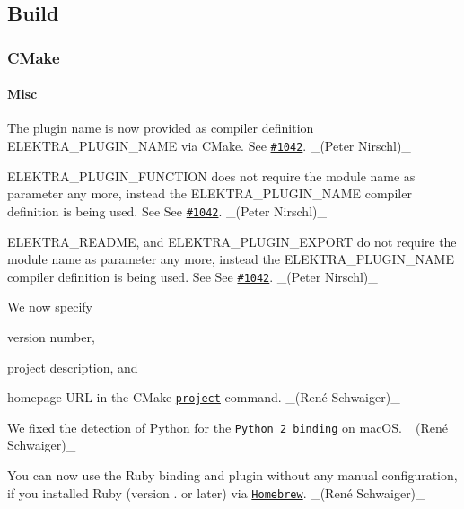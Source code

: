 \subsection*{Build}

\subsubsection*{C\+Make}

\paragraph*{Misc}


\begin{DoxyItemize}
\item The plugin name is now provided as compiler definition {\ttfamily E\+L\+E\+K\+T\+R\+A\+\_\+\+P\+L\+U\+G\+I\+N\+\_\+\+N\+A\+ME} via C\+Make. See \href{https://issues.libelektra.org/1042}{\tt \#1042}. \+\_\+(\+Peter Nirschl)\+\_\+
\item {\ttfamily E\+L\+E\+K\+T\+R\+A\+\_\+\+P\+L\+U\+G\+I\+N\+\_\+\+F\+U\+N\+C\+T\+I\+ON} does not require the module name as parameter any more, instead the {\ttfamily E\+L\+E\+K\+T\+R\+A\+\_\+\+P\+L\+U\+G\+I\+N\+\_\+\+N\+A\+ME} compiler definition is being used. See See \href{https://issues.libelektra.org/1042}{\tt \#1042}. \+\_\+(\+Peter Nirschl)\+\_\+
\item {\ttfamily E\+L\+E\+K\+T\+R\+A\+\_\+\+R\+E\+A\+D\+ME}, and {\ttfamily E\+L\+E\+K\+T\+R\+A\+\_\+\+P\+L\+U\+G\+I\+N\+\_\+\+E\+X\+P\+O\+RT} do not require the module name as parameter any more, instead the {\ttfamily E\+L\+E\+K\+T\+R\+A\+\_\+\+P\+L\+U\+G\+I\+N\+\_\+\+N\+A\+ME} compiler definition is being used. See See \href{https://issues.libelektra.org/1042}{\tt \#1042}. \+\_\+(\+Peter Nirschl)\+\_\+
\item We now specify
\begin{DoxyItemize}
\item version number,
\item project description, and
\item homepage U\+RL in the C\+Make \href{https://cmake.org/cmake/help/latest/command/project.html}{\tt {\ttfamily project}} command. \+\_\+(René Schwaiger)\+\_\+
\end{DoxyItemize}
\item We fixed the detection of Python for the \href{https://www.libelektra.org/bindings/swig_python2}{\tt Python 2 binding} on mac\+OS. \+\_\+(René Schwaiger)\+\_\+
\item You can now use the Ruby binding and plugin without any manual configuration, if you installed Ruby (version {.} or later) via \href{http://brew.sh}{\tt Homebrew}. \+\_\+(René Schwaiger)\+\_\+
\end{DoxyItemize}

